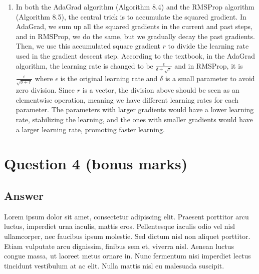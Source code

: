 \documentclass[
	12pt, %
]{../Template/fphw}
\begin{document}
\begin{enumerate}[label = (\arabic*)]
\item In both the AdaGrad algorithm (Algorithm 8.4) and the RMSProp algorithm (Algorithm 8.5), the central trick is to accumulate the squared gradient. In AdaGrad, we sum up all the squared gradients in the current and past steps, and in RMSProp, we do the same, but we gradually decay the past gradients. Then, we use this accumulated square gradient $r$ to divide the learning rate used in the gradient descent step. According to the textbook, in the AdaGrad algorithm, the learning rate is changed to be $\frac{\epsilon}{\delta+\sqrt{r} }$ and in RMSProp, it is $\frac{\epsilon}{\sqrt{\delta+r}}$ where $\epsilon$ is the original learning rate and $\delta$ is a small parameter to avoid zero division. Since $r$ is a vector, the division above should be seen as an elementwise operation, meaning we have different learning rates for each parameter. The parameters with larger gradients would have a lower learning rate, stabilizing the learning, and the ones with smaller gradients would have a larger learning rate, promoting faster learning.

\end{enumerate}

\section*{Question 4 (bonus marks)}

\begin{problem}

\end{problem}


\subsection*{Answer}

Lorem ipsum dolor sit amet, consectetur adipiscing elit. Praesent porttitor arcu luctus, imperdiet urna iaculis, mattis eros. Pellentesque iaculis odio vel nisl ullamcorper, nec faucibus ipsum molestie. Sed dictum nisl non aliquet porttitor. Etiam vulputate arcu dignissim, finibus sem et, viverra nisl. Aenean luctus congue massa, ut laoreet metus ornare in. Nunc fermentum nisi imperdiet lectus tincidunt vestibulum at ac elit. Nulla mattis nisl eu malesuada suscipit.

\end{document}
